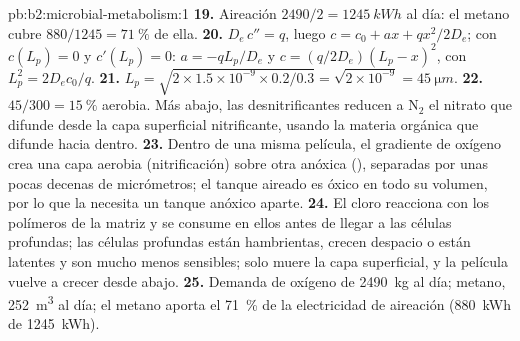 \begin{solution}{pb:b2:microbial-metabolism:1}
\textbf{19.} Aireación $2490/2 = \qty{1245}{kWh}$ al día: el metano
cubre $880/1245 = \qty{71}{\%}$ de ella.
\textbf{20.} $D_e\,c'' = q$, luego $c = c_0 + ax + qx^2/2D_e$; con
$c(L_p) = 0$ y $c'(L_p) = 0$: $a = -qL_p/D_e$ y $c =
(q/2D_e)(L_p - x)^2$, con $L_p^2 = 2D_ec_0/q$.
\textbf{21.} $L_p = \sqrt{2\times 1.5\times 10^{-9}\times 0.2/0.3} =
\sqrt{2\times 10^{-9}} = \qty{45}{\micro m}$.
\textbf{22.} $45/300 = \qty{15}{\%}$ aerobia. Más abajo, las
desnitrificantes reducen a $\mathrm{N_2}$ el nitrato que difunde desde
la capa superficial nitrificante, usando la materia orgánica que
difunde hacia dentro.
\textbf{23.} Dentro de una misma película, el gradiente de oxígeno crea
una capa aerobia (nitrificación) sobre otra anóxica (),
separadas por unas pocas decenas de micrómetros; el tanque aireado es
óxico en todo su volumen, por lo que la  necesita un
tanque anóxico aparte.
\textbf{24.} El cloro reacciona con los polímeros de la matriz y se
consume en ellos antes de llegar a las células profundas; las células
profundas están hambrientas, crecen despacio o están latentes y son
mucho menos sensibles; solo muere la capa superficial, y la película
vuelve a crecer desde abajo.
\textbf{25.} Demanda de oxígeno de \qty{2490}{kg} al día; metano,
\qty{252}{m^3} al día; el metano aporta el \qty{71}{\%} de la
electricidad de aireación (\qty{880}{kWh} de \qty{1245}{kWh}).
\end{solution}
